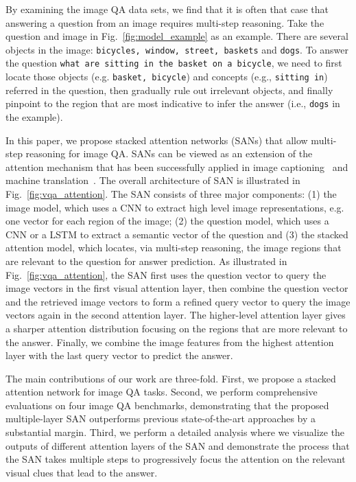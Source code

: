\documentclass[10pt,twocolumn,letterpaper]{article}
\begin{document}
By examining the image QA data sets, we find that it is often that case that
answering a question from an image requires multi-step reasoning. Take the
question and image in Fig.~\ref{fig:model_example} as an example. There are
several objects in the image: \texttt{bicycles, window, street, baskets} and
\texttt{dogs}. To answer the question \texttt{what are sitting in the basket on
  a bicycle}, we need to first locate those objects (e.g. \texttt{basket,
  bicycle}) and concepts (e.g., \texttt{sitting in}) referred in the question,
then gradually rule out irrelevant objects, and finally pinpoint to the region
that are most indicative to infer the answer (i.e., \texttt{dogs} in the
example).

In this paper, we propose stacked attention networks (SANs) that allow
multi-step reasoning for image QA. SANs can be viewed as an extension of the
attention mechanism that has been successfully applied in image
captioning~\cite{xu2015show} and machine
translation~\cite{bahdanau2014neural}. The overall architecture of SAN is
illustrated in Fig.~\ref{fig:vqa_attention}. The SAN consists of three major
components: (1) the image model, which uses a CNN to extract high level image
representations, e.g. one vector for each region of the image; (2) the question
model, which uses a CNN or a LSTM to extract a semantic vector of the question
and (3) the stacked attention model, which locates, via multi-step reasoning,
the image regions that are relevant to the question for answer prediction. As
illustrated in Fig.~\ref{fig:vqa_attention}, the SAN first uses the question
vector to query the image vectors in the first visual attention layer, then
combine the question vector and the retrieved image vectors to form a refined
query vector to query the image vectors again in the second attention
layer. The higher-level attention layer gives a sharper attention distribution
focusing on the regions that are more relevant to the answer. Finally, we
combine the image features from the highest attention layer with the last query
vector to predict the answer.

The main contributions of our work are three-fold. First, we propose a stacked
attention network for image QA tasks. Second, we perform comprehensive
evaluations on four image QA benchmarks, demonstrating that the proposed
multiple-layer SAN outperforms previous state-of-the-art approaches by a
substantial margin. Third, we perform a detailed analysis where we visualize
the outputs of different attention layers of the SAN and demonstrate the
process that the SAN takes multiple steps to progressively focus the attention
on the relevant visual clues that lead to the answer.
\end{document}
